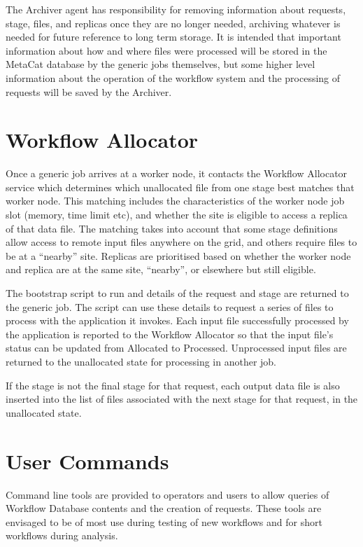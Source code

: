 \documentclass[../main-v1.tex]{subfiles}
\begin{document}
The Archiver agent has responsibility for removing information about requests, stage, files, and replicas once they are no longer needed, archiving whatever is needed for future reference to long term storage. It is intended that important information about how and where files were processed will be stored in the MetaCat database by the generic jobs themselves, but some higher level information about the operation of the workflow system and the processing of requests will be saved by the Archiver.

\section{Workflow Allocator}
\label{sec:flow:allocator}

Once a generic job arrives at a worker node, it contacts the Workflow Allocator service which determines which unallocated file from one stage best matches that worker node. This matching includes the characteristics of the worker node job slot (memory, time limit etc), and whether the site is eligible to access a replica of that data file. The matching takes into account that some stage definitions allow access to remote input files anywhere on the grid, and others require files to be at a ``nearby'' site. Replicas are prioritised based on whether the worker node and replica are at the same site, ``nearby'', or elsewhere but still eligible. 

The bootstrap script to run and details of the request and stage are returned to the generic job. The script can use these details to request a series of files to process with the application it invokes. Each input file successfully processed by the application is reported to the Workflow Allocator so that the input file’s status can be updated from Allocated to Processed. Unprocessed input files are returned to the unallocated state for processing in another job. 

If the stage is not the final stage for that request, each output data file is also inserted into the list of files associated with the next stage for that request, in the unallocated state. 

\section{User Commands}
\label{sec:flow:commands}

Command line tools are provided to operators and users to allow queries of Workflow Database contents and the creation of requests. These tools are envisaged to be of most use during testing of new workflows and for short workflows during analysis. 
\end{document}
